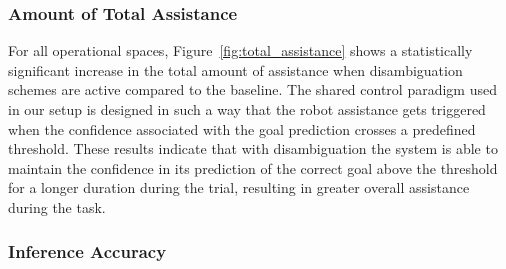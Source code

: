\documentclass[letterpaper, 10 pt, conference]{ieeeconf}  %
\begin{document}
\subsubsection{Amount of Total Assistance}

For all operational spaces, Figure~\ref{fig:total_assistance} shows a statistically significant increase in the total amount of assistance when disambiguation schemes are active compared to the baseline.
The shared control paradigm used in our setup is designed in such a way that the robot assistance gets triggered when the confidence associated with the goal prediction crosses a predefined threshold. These results indicate that with disambiguation the system is able to maintain the confidence in its prediction of the correct goal above the threshold for a longer duration during the trial, resulting in greater overall assistance during the task.

\subsubsection{Inference Accuracy}
\end{document}
